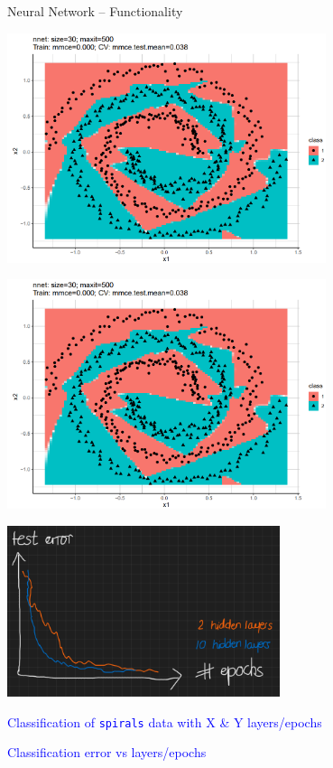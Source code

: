 \documentclass[11pt,compress,t,notes=noshow, xcolor=table]{beamer}
\let\code=\texttt
\begin{document}
\begin{frame}{Neural Network -- Functionality}
\begin{minipage}{0.33\textwidth}
  \includegraphics[width=0.7\textwidth]{figure/nn-decision-regions}
\end{minipage}%
\begin{minipage}{0.33\textwidth}
  \includegraphics[width=0.7\textwidth]{figure/nn-decision-regions}
\end{minipage}%
\begin{minipage}{0.33\textwidth}
  \includegraphics[width=0.6\textwidth]{figure/nn-mmce-epochs}
\end{minipage}
\begin{minipage}{0.67\textwidth}
  \tiny \textcolor{blue}{Classification of \code{spirals} data with X \& Y 
  layers/epochs}
\end{minipage}%
\begin{minipage}{0.33\textwidth}
  \tiny \textcolor{blue}{Classification error vs layers/epochs}
\end{minipage}

\end{frame}
\end{document}
